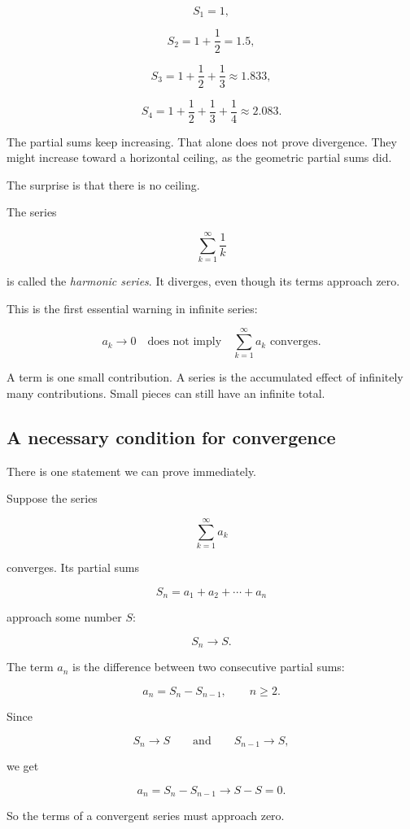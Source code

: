 \[
S_1=1,
\]

\[
S_2=1+\frac12=1.5,
\]

\[
S_3=1+\frac12+\frac13\approx1.833,
\]

\[
S_4=1+\frac12+\frac13+\frac14\approx2.083.
\]

The partial sums keep increasing.  That alone does not prove divergence.  They might
increase toward a horizontal ceiling, as the geometric partial sums did.

The surprise is that there is no ceiling.

The series

\[
\sum_{k=1}^{\infty}\frac1k
\]

is called the \emph{harmonic series}.  It diverges, even though its terms approach
zero.

This is the first essential warning in infinite series:

\[
\boxed{
 a_k\to0 \quad \text{does not imply} \quad \sum_{k=1}^{\infty}a_k \text{ converges.}
}
\]

A term is one small contribution.  A series is the accumulated effect of infinitely many
contributions.  Small pieces can still have an infinite total.

\subsection{A necessary condition for convergence}
\label{subsec:necessary-condition-for-series-convergence}

There is one statement we can prove immediately.

Suppose the series

\[
\sum_{k=1}^{\infty}a_k
\]

converges.  Its partial sums

\[
S_n=a_1+a_2+\cdots+a_n
\]

approach some number \(S\):

\[
S_n\to S.
\]

The term \(a_n\) is the difference between two consecutive partial sums:

\[
a_n=S_n-S_{n-1},
\qquad n\ge2.
\]

Since

\[
S_n\to S
\qquad\text{and}\qquad
S_{n-1}\to S,
\]

we get

\[
a_n=S_n-S_{n-1}\to S-S=0.
\]

So the terms of a convergent series must approach zero.

